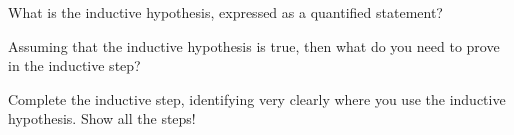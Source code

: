 \documentclass[12pt]{exam}
\begin{document}
\begin{questions}
{\begin{minipage}[t]{14.55cm}
			\vspace{25pt}
			\end{minipage}
		}
		
\clearpage
		
	\question[2] What is the inductive hypothesis, expressed as a quantified statement?
	
	
\clearpage
		
	\question[1] Assuming that the inductive hypothesis is true, then what do you need to prove in the inductive step?
	

\clearpage
		
	\question[3] Complete the inductive step, identifying very clearly where you use the inductive hypothesis. Show all the steps!
	
		\fbox{\begin{minipage}[t]{14.55cm} \color{red}
			\vspace{25pt}
			

\end{minipage}}
\end{questions}
\end{document}
